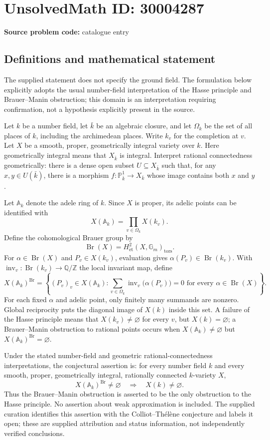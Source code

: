 \documentclass[11pt]{article}
\newcommand{\Z}{\mathbb{Z}}
\newcommand{\Q}{\mathbb{Q}}
\newcommand{\A}{\mathbb{A}}
\newcommand{\PP}{\mathbb{P}}
\begin{document}
\section*{UnsolvedMath ID: 30004287}
\textbf{Source problem code:} catalogue entry
\subsection{Definitions and mathematical statement}
The supplied statement does not specify the ground field. The formulation below explicitly adopts the usual number-field interpretation of the Hasse principle and Brauer--Manin obstruction; this domain is an interpretation requiring confirmation, not a hypothesis explicitly present in the source.

Let \(k\) be a number field, let \(\bar{k}\) be an algebraic closure, and let \(\Omega_k\) be the set of all places of \(k\), including the archimedean places. Write \(k_v\) for the completion at \(v\). Let \(X\) be a smooth, proper, geometrically integral variety over \(k\). Here geometrically integral means that \(X_{\bar{k}}\) is integral. Interpret rational connectedness geometrically: there is a dense open subset \(U\subseteq X_{\bar{k}}\) such that, for any \(x,y\in U(\bar{k})\), there is a morphism \(f:\PP^1_{\bar{k}}\to X_{\bar{k}}\) whose image contains both \(x\) and \(y\).

Let \(\A_k\) denote the adele ring of \(k\). Since \(X\) is proper, its adelic points can be identified with
\[
X(\A_k)=\prod_{v\in\Omega_k}X(k_v).
\]
Define the cohomological Brauer group by
\[
\operatorname{Br}(X)=H^2_{\mathrm{\acute{e}t}}(X,\mathbb G_m)_{\mathrm{tors}}.
\]
For \(\alpha\in\operatorname{Br}(X)\) and \(P_v\in X(k_v)\), evaluation gives \(\alpha(P_v)\in\operatorname{Br}(k_v)\). With \(\operatorname{inv}_v:\operatorname{Br}(k_v)\to\Q/\Z\) the local invariant map, define
\[
X(\A_k)^{\operatorname{Br}}=
\left\{(P_v)_v\in X(\A_k):
\sum_{v\in\Omega_k}\operatorname{inv}_v\bigl(\alpha(P_v)\bigr)=0
\text{ for every }\alpha\in\operatorname{Br}(X)\right\}.
\]
For each fixed \(\alpha\) and adelic point, only finitely many summands are nonzero. Global reciprocity puts the diagonal image of \(X(k)\) inside this set. A failure of the Hasse principle means that \(X(k_v)\ne\varnothing\) for every \(v\), but \(X(k)=\varnothing\); a Brauer--Manin obstruction to rational points occurs when \(X(\A_k)\ne\varnothing\) but \(X(\A_k)^{\operatorname{Br}}=\varnothing\).

Under the stated number-field and geometric rational-connectedness interpretations, the conjectural assertion is: for every number field \(k\) and every smooth, proper, geometrically integral, rationally connected \(k\)-variety \(X\),
\[
X(\A_k)^{\operatorname{Br}}\ne\varnothing
\quad\Longrightarrow\quad
X(k)\ne\varnothing.
\]
Thus the Brauer--Manin obstruction is asserted to be the only obstruction to the Hasse principle. No assertion about weak approximation is included. The supplied curation identifies this assertion with the Colliot--Th\'el\`ene conjecture and labels it open; these are supplied attribution and status information, not independently verified conclusions.
\end{document}
